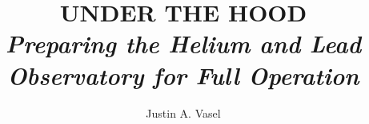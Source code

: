 %
%
%
%


\ms %

\title{\fontsize{45}{60}\selectfont\garamond UNDER THE HOOD \normalfont \normalsize  \\ \vspace{0.1in} \large \light \emph{Preparing the Helium and Lead Observatory for Full Operation} \normalfont \normalsize}
\author{Justin A. Vasel}


\abstract{}
\copyrightpage %
\acknowledgements{}
\dedication{}
\abbreviations{}


\beforepreface 

\figurespage
\tablespage

\afterpreface            


